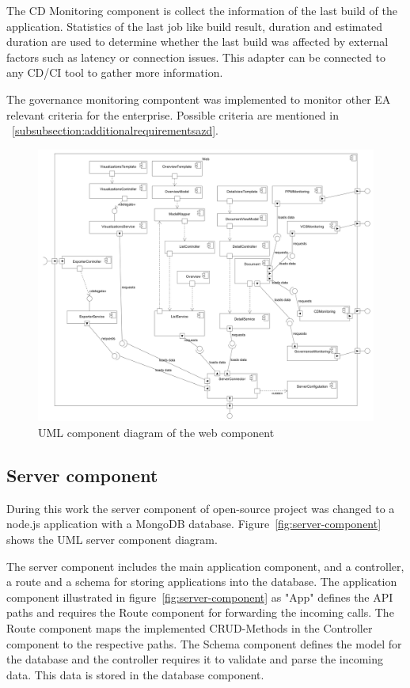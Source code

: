 The CD Monitoring component is collect the information of the last build of the application. Statistics of the last job like build result, duration and estimated duration are used to determine whether the last build was affected by external factors such as latency or connection issues. This adapter can be connected to any CD/CI tool to gather more information.

The governance monitoring compontent was implemented to monitor other EA relevant criteria for the enterprise. Possible criteria are mentioned in ~\ref{subsubsection:additionalrequirementsazd}.

\begin{figure}[htpb]
  \centering
  \includegraphics[width=1.0\textwidth]{figures/web-componentdiagram.PNG}
  \caption{UML component diagram of the web component}
  \label{fig:web-component}
\end{figure}

\subsection{Server component}

During this work the server component of open-source project was changed to a node.js application with a MongoDB database. Figure~\ref{fig:server-component} shows the UML server component diagram.

The server component includes the main application component, and a controller, a route and a schema for storing applications into the database. The application component illustrated in figure~\ref{fig:server-component} as "App" defines the API paths and requires the Route component for forwarding the incoming calls. The Route component maps the implemented CRUD-Methods in the Controller component to the respective paths. The Schema component defines the model for the database and the controller requires it to validate and parse the incoming data. This data is stored in the database component. 

